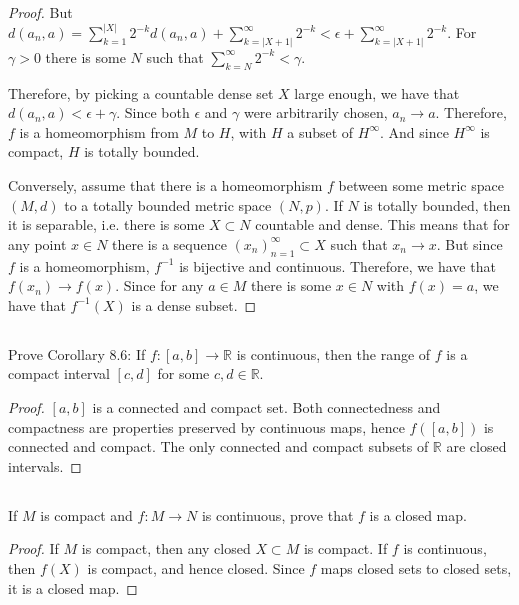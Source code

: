 \begin{proof}
But $d(a_n, a) = \sum_{k=1}^{|X|} 2^{-k} d(a_n, a) + \sum_{k=|X+1|}^\infty 2^{-k} < \epsilon + \sum_{k=|X+1|}^\infty 2^{-k}$. For $\gamma > 0$ there is some $N$ such that $\sum_{k=N}^\infty 2^{-k} < \gamma$.

Therefore, by picking a countable dense set $X$ large enough, we have that $d(a_n, a) < \epsilon + \gamma$. Since both $\epsilon$ and $\gamma$ were arbitrarily chosen, $a_n \rightarrow a$. Therefore, $f$ is a homeomorphism from $M$ to $H$, with $H$ a subset of $H^\infty$. And since $H^\infty$ is compact, $H$ is totally bounded.

\vspace{1em}

Conversely, assume that there is a homeomorphism $f$ between some metric space $(M,d)$ to a totally bounded metric space $(N,p)$. If $N$ is totally bounded, then it is separable, i.e. there is some $X \subset N$ countable and dense. This means that for any point $x \in N$ there is a sequence $(x_n)_{n=1}^\infty \subset X$ such that $x_n \rightarrow x$. But since $f$ is a homeomorphism, $f^{-1}$ is bijective and continuous. Therefore, we have that $f(x_n) \rightarrow f(x)$. Since for any $a \in M$ there is some $x \in N$ with $f(x) = a$, we have that $f^{-1}(X)$ is a dense subset.

\end{proof}



\subsection{} Prove Corollary 8.6: If $f : [a, b ] \rightarrow \mathbb{R}$ is continuous, then the range of $f$ is a compact interval $[ c, d ]$ for some $c, d \in \mathbb{R}$.

\begin{proof}
$[a,b]$ is a connected and compact set. Both connectedness and compactness are properties preserved by continuous maps, hence $f([a,b])$ is connected and compact. The only connected and compact subsets of $\mathbb{R}$ are closed intervals.
\end{proof}


\subsection{} If $M$ is compact and $f: M \rightarrow N$ is continuous, prove that $f$ is a closed map. 

\begin{proof}
If $M$ is compact, then any closed $X \subset M$ is compact. If $f$ is continuous, then $f(X)$ is compact, and hence closed. Since $f$ maps closed sets to closed sets, it is a closed map.
\end{proof}


